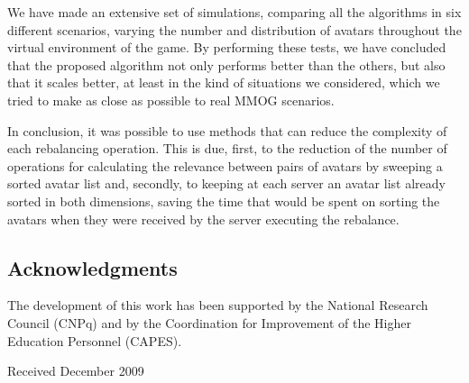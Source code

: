 \documentclass[acmjacm]{acmtrans2m}
\let\mycounter\setcounter
\begin{document}
We have made an extensive set of simulations, comparing all the algorithms in six different scenarios, varying the number and distribution of avatars throughout the virtual environment of the game. By performing these tests, we have concluded that the proposed algorithm not only performs better than the others, but also that it scales better, at least in the kind of situations we considered, which we tried to make as close as possible to real MMOG scenarios.

In conclusion, it was possible to use methods that can reduce the complexity of each rebalancing operation. This is due, first, to the reduction of the number of operations for calculating the relevance between pairs of avatars by sweeping a sorted avatar list and, secondly, to keeping at each server an avatar list already sorted in both dimensions, saving the time that would be spent on sorting the avatars when they were received by the server executing the rebalance.



\subsection{Acknowledgments}

The development of this work has been supported by the National Research Council (CNPq) and by the Coordination for Improvement of the Higher Education Personnel (CAPES).



\begin{received}
Received December 2009%
\end{received}


\medskip
\end{document}
